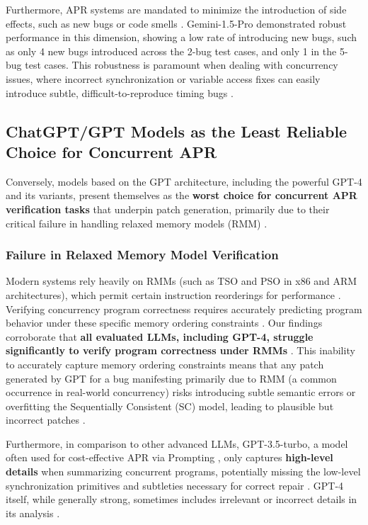 Furthermore, APR systems are mandated to minimize the introduction of side effects, such as new bugs or code smells \cite{anand2024,liyanage2025}. Gemini-1.5-Pro demonstrated robust performance in this dimension, showing a low rate of introducing new bugs, such as only 4 new bugs introduced across the 2-bug test cases, and only 1 in the 5-bug test cases. This robustness is paramount when dealing with concurrency issues, where incorrect synchronization or variable access fixes can easily introduce subtle, difficult-to-reproduce timing bugs \cite{upadhyay2023,liyanage2025}.

\subsection{ChatGPT/GPT Models as the Least Reliable Choice for Concurrent APR}

Conversely, models based on the GPT architecture, including the powerful GPT-4 and its variants, present themselves as the \textbf{worst choice for concurrent APR verification tasks} that underpin patch generation, primarily due to their critical failure in handling relaxed memory models (RMM) \cite{anand2024,jain2025}.

\subsubsection{Failure in Relaxed Memory Model Verification}

Modern systems rely heavily on RMMs (such as TSO and PSO in x86 and ARM architectures), which permit certain instruction reorderings for performance \cite{yu2018}. Verifying concurrency program correctness requires accurately predicting program behavior under these specific memory ordering constraints \cite{yu2018}. Our findings corroborate that \textbf{all evaluated LLMs, including GPT-4, struggle significantly to verify program correctness under RMMs} \cite{anand2024,jain2025}. This inability to accurately capture memory ordering constraints means that any patch generated by GPT for a bug manifesting primarily due to RMM (a common occurrence in real-world concurrency) risks introducing subtle semantic errors or overfitting the Sequentially Consistent (SC) model, leading to plausible but incorrect patches \cite{anand2024, yang2023}.

Furthermore, in comparison to other advanced LLMs, GPT-3.5-turbo, a model often used for cost-effective APR via Prompting \cite{anand2024}, only captures \textbf{high-level details} when summarizing concurrent programs, potentially missing the low-level synchronization primitives and subtleties necessary for correct repair \cite{jain2025}. GPT-4 itself, while generally strong, sometimes includes irrelevant or incorrect details in its analysis \cite{jain2025}.

